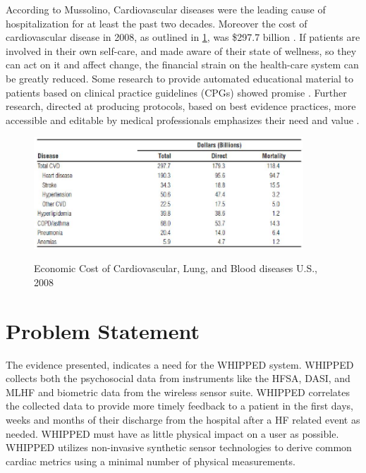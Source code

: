 According to Mussolino, Cardiovascular diseases were the leading cause of hospitalization for at least the past two decades. Moreover the cost of cardiovascular disease in 2008, as outlined in \cref{fig:CVDCost}, was \$297.7 billion \cite{Mussolino2012}. If patients are involved in their own self-care, and made aware of their state of wellness, so they can act on it and affect change, the financial strain on the health-care system can be greatly reduced. Some research to provide automated educational material to patients based on clinical practice guidelines (CPGs) showed promise \cite{Jones2005}. Further research, directed at producing protocols, based on best evidence practices, more accessible and editable by medical professionals emphasizes their need and value \cite{Shah2001}.

\begin{figure}
	\begin{center}
		\label{fig:CVDCost}
		\includegraphics[scale=1,width=0.9\textwidth]{Images/CostOfCVD.jpg} 
		\caption{Economic Cost of Cardiovascular, Lung, and Blood diseases U.S., 2008 }
	\end{center}
\end{figure}

\section{Problem Statement}
\label{sec:problemStatement}
The evidence presented, indicates a need for the WHIPPED system. WHIPPED collects both the psychosocial data from instruments like the HFSA, DASI, and MLHF and biometric data from the wireless sensor suite.  WHIPPED correlates the collected data to provide more timely feedback to a patient in the first days, weeks and months of their discharge from the hospital after a HF related event as needed. WHIPPED must have as little physical impact on a user as possible. WHIPPED utilizes non-invasive synthetic sensor technologies to derive common cardiac metrics using a minimal number of physical measurements. 

